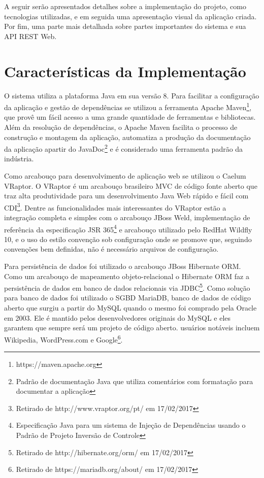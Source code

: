 A seguir serão apresentados detalhes sobre a implementação do projeto, como tecnologias utilizadas, e em seguida uma apresentação visual da aplicação criada. Por fim, uma parte mais detalhada sobre partes importantes do sistema e sua API REST Web.





\section{Características da Implementação} \label{sec:ajudaai:caracteristicas}

O sistema utiliza a plataforma Java em sua versão 8. Para facilitar a configuração da aplicação e gestão de dependências se utilizou a ferramenta Apache Maven\footnote{https://maven.apache.org}, que provê um fácil acesso a uma grande quantidade de ferramentas e bibliotecas. Além da resolução de dependências, o Apache Maven facilita o processo de construção e montagem da aplicação, automatiza a produção da documentação da aplicação apartir do JavaDoc\footnote{Padrão de documentação Java que utiliza comentários com formatação para documentar a aplicação} e é considerado uma ferramenta padrão da indústria.

Como arcabouço para desenvolvimento de aplicação web se utilizou o Caelum VRaptor. O VRaptor é um arcabouço brasileiro MVC de código fonte aberto que traz alta produtividade para um desenvolvimento Java Web rápido e fácil com CDI\footnote{Retirado de http://www.vraptor.org/pt/ em 17/02/2017}. Dentre as funcionalidades mais interessantes do VRaptor estão a integração completa e simples com o arcabouço JBoss Weld, implementação de referência da especificação JSR 365\footnote{Especificação Java para um sistema de Injeção de Dependências usando o Padrão de Projeto Inversão de Controle} e arcabouço utilizado pelo RedHat Wildfly 10, e o uso do estilo convenção sob configuração onde se promove que, seguindo convenções bem definidas, não é necessário arquivos de configuração.

Para persistência de dados foi utilizado o arcabouço JBoss Hibernate ORM. Como um arcabouço de mapeamento objeto-relacional o Hibernate ORM faz a persistência de dados em banco de dados relacionais via JDBC\footnote{Retirado de http://hibernate.org/orm/ em 17/02/2017}. Como solução para banco de dados foi utilizado o SGBD MariaDB, banco de dados de código aberto que surgiu a partir do MySQL quando o mesmo foi comprado pela Oracle em 2003. Ele é mantido pelos desenvolvedores originais do MySQL e eles garantem que sempre será um projeto de código aberto. usuários notáveis incluem Wikipedia, WordPress.com e Google\footnote{Retirado de https://mariadb.org/about/ em 17/02/2017}.

